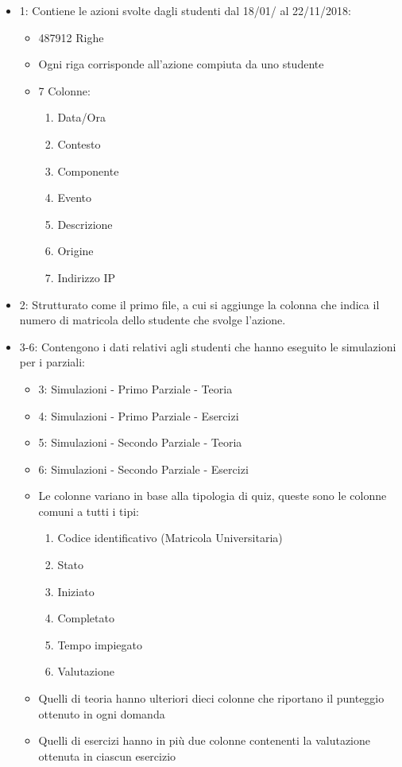 \begin{itemize}

\item 1: Contiene le azioni svolte dagli studenti dal 18/01/ al 22/11/2018:
\begin{itemize}
   \item 487912 Righe
   \item Ogni riga corrisponde all'azione compiuta da uno studente
   \item 7 Colonne:
   \begin{enumerate}
      \item Data/Ora
      \item Contesto
      \item Componente
      \item Evento
      \item Descrizione
      \item Origine
      \item Indirizzo IP
   \end{enumerate}
\end{itemize}

\item 2: Strutturato come il primo file, a cui si aggiunge la colonna che indica il numero di matricola dello studente che svolge l'azione.

\item 3-6: Contengono i dati relativi agli studenti che hanno eseguito le simulazioni per i parziali:
\begin{itemize}
\item 3: Simulazioni - Primo Parziale - Teoria
\item 4: Simulazioni - Primo Parziale - Esercizi
\item 5: Simulazioni - Secondo Parziale - Teoria
\item 6: Simulazioni - Secondo Parziale - Esercizi
\item Le colonne variano in base alla tipologia di quiz, queste sono le colonne comuni a tutti i tipi:
\begin{enumerate}
   \item Codice identificativo (Matricola Universitaria)
   \item Stato
   \item Iniziato
   \item Completato
   \item Tempo impiegato
   \item Valutazione   
\end{enumerate}
\item Quelli di teoria hanno ulteriori dieci colonne che riportano il punteggio ottenuto in ogni domanda
\item Quelli di esercizi hanno in più due colonne contenenti la valutazione ottenuta in ciascun esercizio
\end{itemize}


\end{itemize}
